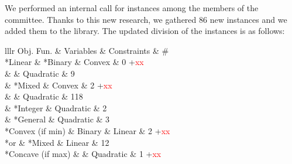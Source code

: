 \documentclass[11pt]{article}
\newcommand{\rep}[1]{{\textcolor{acblue}{#1}}}
\begin{document}
\rep{
We performed an internal call for instances among the members of the committee. 
Thanks to this new research, we gathered $86$ new instances and we added them to the library. The updated division of the instances is as follows:\\
\begin{tabular}{lllr}
\toprule
Obj. Fun. & Variables & Constraints & \#\\
\cmidrule(lr){1-4}
%
\multirow{6}*{Linear}
          & \multirow{2}*{Binary}
                    & Convex    &   0 +\textcolor{red}{xx}\\[1.2 ex]
           &         & Quadratic &   9 \\[1.2 ex]
\cmidrule(lr){2-4}
          & \multirow{2}*{Mixed}
                    & Convex    &   2 +\textcolor{red}{xx}\\[1.2 ex]
          &         & Quadratic &    118\\[1.2 ex]
\cmidrule(lr){2-4}
          & \multirow{1}*{Integer}
                   & Quadratic &    2\\[1.2 ex]
\cmidrule(lr){2-4}
          & \multirow{1}*{General}
                   & Quadratic &    3\\[1.2 ex]
\cmidrule(lr){1-4}
\multirow{1}*{Convex (if min)}
          & Binary  & Linear    &  2  +\textcolor{red}{xx}\\[1.2 ex]
\cmidrule(lr){2-4}
\multirow{1}*{or}
          & \multirow{2}*{Mixed}
                    & Linear    &   12\\[1.2 ex]
\multirow{1}*{Concave (if max)}
          &         & Quadratic &    1 +\textcolor{red}{xx}\\[1.2 ex]

\end{tabular}}
\end{document}
